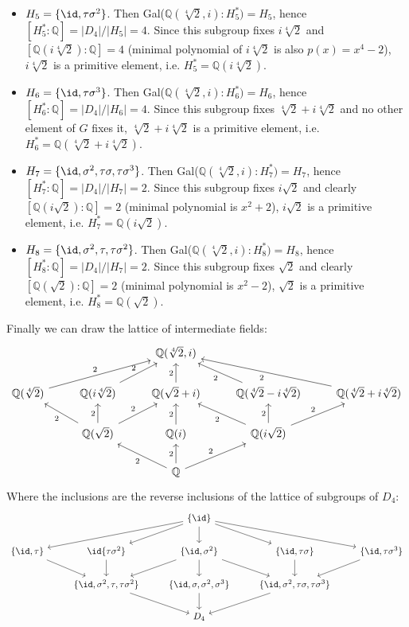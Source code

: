\documentclass[12pt,a4paper]{article}
\newcommand{\Q}{\mathbb{Q}}
\begin{document}
\begin{enumerate}[e)]
\begin{itemize}
\item $H_5=\{\id, \tau\sigma^2\}$. Then Gal($\mathbb{Q}(\sqrt[4]{2}, i): H_5^*)=H_5$, hence $[H_5^*:\Q]=|D_4|/|H_5|= 4$. Since this subgroup fixes $i\sqrt[4]{2}$ and $[\mathbb{Q}(i\sqrt[4]{2}):\Q]=4$ (minimal polynomial of $i\sqrt[4]{2}$ is also $p(x)=x^4-2$), $i\sqrt[4]{2}$ is a primitive element, i.e. $H_5^*=\Q(i\sqrt[4]{2})$.
\item $H_6=\{\id, \tau\sigma^3\}$. Then Gal($\mathbb{Q}(\sqrt[4]{2}, i): H_6^*)=H_6$, hence $[H_6^*:\Q]=|D_4|/|H_6|= 4$. Since this subgroup fixes $\sqrt[4]{2} +i\sqrt[4]{2}$ and no other element of $G$ fixes it, $\sqrt[4]{2} + i\sqrt[4]{2}$ is a primitive element, i.e. $H_6^*=\Q(\sqrt[4]{2} +i\sqrt[4]{2})$.
\item $H_7=\{\id, \sigma^2, \tau\sigma, \tau\sigma^3\}$. Then Gal($\mathbb{Q}(\sqrt[4]{2}, i): H_7^*)=H_7$, hence $[H_7^*:\Q]=|D_4|/|H_7|= 2$. Since this subgroup fixes $i\sqrt{2}$ and clearly $[\Q(i\sqrt{2}):\Q]=2$ (minimal polynomial is $x^2+2$), $i\sqrt{2}$ is a primitive element, i.e. $H_7^*=\Q(i\sqrt{2})$.
\item $H_8=\{\id, \sigma^2, \tau, \tau\sigma^2\}$. Then Gal($\mathbb{Q}(\sqrt[4]{2}, i): H_8^*)=H_8$, hence $[H_8^*:\Q]=|D_4|/|H_7|= 2$. Since this subgroup fixes $\sqrt{2}$ and clearly $[\Q(\sqrt{2}):\Q]=2$ (minimal polynomial is $x^2-2$), $\sqrt{2}$ is a primitive element, i.e. $H_8^*=\Q(\sqrt{2})$.
\end{itemize}
\end{enumerate}
Finally we can draw the lattice of intermediate fields:
\begin{equation*}
\begin{tikzcd}
& & \mathbb{Q}(\sqrt[4]{2},i) & & \\
\mathbb{Q}(\sqrt[4]{2}) \arrow [urr, "2"] & \mathbb{Q}(i\sqrt[4]{2})\arrow[ur, "2"] &\mathbb{Q}(\sqrt{2} + i)\arrow[u, "2"] & \mathbb{Q}(\sqrt[4]{2} - i\sqrt[4]{2})\arrow[ul, "2"] & \mathbb{Q}(\sqrt[4]{2} + i\sqrt[4]{2})\arrow[ull, "2"]\\
& \mathbb{Q}(\sqrt{2}) \arrow[ul, "2"]\arrow[u,"2"] \arrow[ur,"2"]&  \mathbb{Q}(i)\arrow[u, "2"] & \mathbb{Q}(i\sqrt{2})\arrow[ul, "2"]\arrow[u, "2"]\arrow[ur, "2"] &\\
& & \Q \arrow[ul, "2"] \arrow[u, "2"] \arrow[ur, "2"]& &
\end{tikzcd}
\end{equation*}
Where the inclusions are the reverse inclusions of the lattice of subgroups of $D_4$:
\begin{equation*}
\begin{tikzcd}
& & \{\id\} \arrow [drr] \arrow [dr] \arrow [d] \arrow [dl] \arrow [dll] & & \\
\{\id, \tau\} \arrow[dr]& \id \{\tau\sigma^2\} \arrow[d] & \{\id, \sigma^2\} \arrow[dl] \arrow[d]\arrow[dr]& \{\id, \tau\sigma\} \arrow[d] & \{\id, \tau\sigma^3\} \arrow[dl] \\
& \{\id, \sigma^2, \tau, \tau\sigma^2 \} \arrow[dr] & \{\id, \sigma, \sigma^2, \sigma^3 \} \arrow[d]  &\{\id, \sigma^2, \tau\sigma , \tau\sigma^3 \} \arrow[dl] &\\
& & D_4 & &
\end{tikzcd}
\end{equation*}
\end{document}
